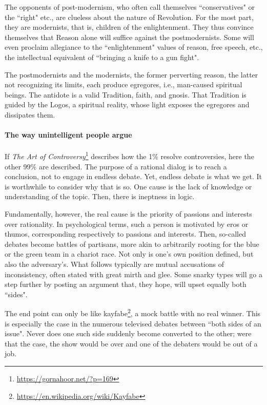 The opponents of post-modernism, who often call themselves ``conservatives" or the ``right" etc., are clueless about the nature of Revolution. For the most part, they are modernists, that is, children of the enlightenment. They thus convince themselves that Reason alone will suffice against the postmodernists. Some will even proclaim allegiance to the ``enlightenment" values of reason, free speech, etc., the intellectual equivalent of ``bringing a knife to a gun fight".

The postmodernists and the modernists, the former perverting reason, the latter not recognizing its limits, each produce egregores, i.e., man-caused spiritual beings. The antidote is a valid Tradition, faith, and gnosis. That Tradition is guided by the Logos, a spiritual reality, whose light exposes the egregores and dissipates them.

\paragraph{The way unintelligent people argue}
If \textit{The Art of Controversy}\footnote{\url{https://gornahoor.net/?p=169}} describes how the 1\% resolve controversies, here the other 99\% are described. The purpose of a rational dialog is to reach a conclusion, not to engage in endless debate. Yet, endless debate is what we get. It is worthwhile to consider why that is so. One cause is the lack of knowledge or understanding of the topic. Then, there is ineptness in logic.

Fundamentally, however, the real cause is the priority of passions and interests over rationality. In psychological terms, such a person is motivated by eros or thumos, corresponding respectively to passions and interests. Then, so-called debates become battles of partisans, more akin to arbitrarily rooting for the blue or the green team in a chariot race. Not only is one's own position defined, but also the adversary's. What follows typically are mutual accusations of inconsistency, often stated with great mirth and glee. Some snarky types will go a step further by posting an argument that, they hope, will upset equally both ``sides".

The end point can only be like kayfabe\footnote{\url{https://en.wikipedia.org/wiki/Kayfabe}}, a mock battle with no real winner. This is especially the case in the numerous televised debates between ``both sides of an issue". Never does one such side suddenly become converted to the other; were that the case, the show would be over and one of the debaters would be out of a job.

